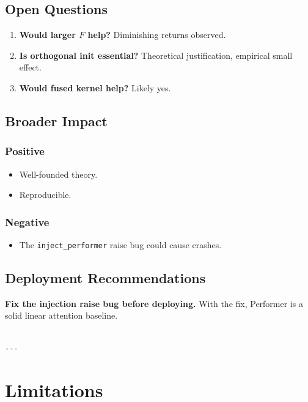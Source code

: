 \subsection{Open Questions}

\begin{enumerate}
\item \textbf{Would larger $F$ help?} Diminishing returns observed.
\item \textbf{Is orthogonal init essential?} Theoretical justification, empirical
  small effect.
\item \textbf{Would fused kernel help?} Likely yes.

\end{enumerate}
\subsection{Broader Impact}

\subsubsection{Positive}

\begin{itemize}
\item Well-founded theory.
\item Reproducible.

\end{itemize}
\subsubsection{Negative}

\begin{itemize}
\item The \texttt{inject\_performer} raise bug could cause crashes.

\end{itemize}
\subsection{Deployment Recommendations}

\textbf{Fix the injection raise bug before deploying.} With the fix, Performer 
is a solid linear attention baseline.
\begin{lstlisting}

---
\end{lstlisting}


\section{Limitations}

